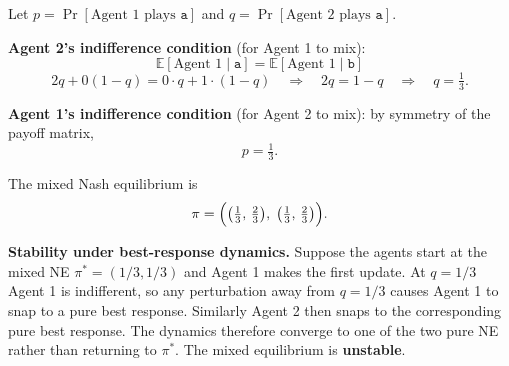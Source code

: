 \begin{enumerate}
\begin{solution}
Let $p = \Pr[\text{Agent 1 plays }\texttt{a}]$ and $q = \Pr[\text{Agent 2 plays }\texttt{a}]$.

\medskip
\noindent \textbf{Agent 2's indifference condition} (for Agent 1 to mix):
\[
\mathbb{E}[\text{Agent 1} \mid \texttt{a}] = \mathbb{E}[\text{Agent 1} \mid \texttt{b}]
\]
\[
2q + 0(1-q) = 0 \cdot q + 1\cdot(1-q)
\quad\Longrightarrow\quad
2q = 1-q
\quad\Longrightarrow\quad
q = \tfrac{1}{3}.
\]

\noindent \textbf{Agent 1's indifference condition} (for Agent 2 to mix): by symmetry of the payoff matrix,
\[
p = \tfrac{1}{3}.
\]

\noindent The mixed Nash equilibrium is
\[
\pi = \Bigl(\bigl(\tfrac{1}{3},\,\tfrac{2}{3}\bigr),\;\bigl(\tfrac{1}{3},\,\tfrac{2}{3}\bigr)\Bigr).
\]

\medskip
\noindent \textbf{Stability under best-response dynamics.}
Suppose the agents start at the mixed NE $\pi^* = (1/3, 1/3)$ and Agent 1 makes the first update.  At $q=1/3$ Agent 1 is indifferent, so any perturbation away from $q=1/3$ causes Agent 1 to snap to a pure best response.  Similarly Agent 2 then snaps to the corresponding pure best response.  The dynamics therefore converge to one of the two pure NE rather than returning to $\pi^*$.  The mixed equilibrium is \textbf{unstable}.
\end{solution}
\vspace{3cm}
\end{enumerate}
\clearpage

